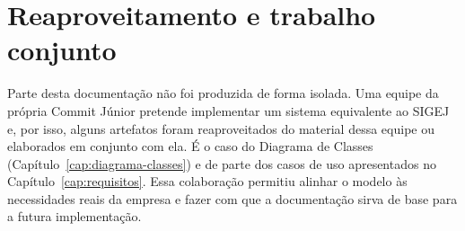 \chapter{Reaproveitamento e trabalho conjunto}
\label{cap:trabalho-conjunto}

Parte desta documentação não foi produzida de forma isolada. Uma equipe da própria Commit Júnior pretende implementar um sistema equivalente ao SIGEJ e, por isso, alguns artefatos foram reaproveitados do material dessa equipe ou elaborados em conjunto com ela. É o caso do Diagrama de Classes (Capítulo~\ref{cap:diagrama-classes}) e de parte dos casos de uso apresentados no Capítulo~\ref{cap:requisitos}. Essa colaboração permitiu alinhar o modelo às necessidades reais da empresa e fazer com que a documentação sirva de base para a futura implementação.

